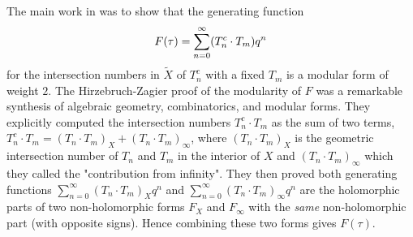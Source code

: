 The main work in \cite{HZ} was to show that the generating function
\[\vspace{-.1cm}
F(\tau) = \sum_{n=0}^{\infty} (T_n^c \cdot T_m) q^n \vspace{-.1cm}
\]
for the intersection numbers in $\tilde{X}$ of $T^c_n$ with a fixed $T_m$ is a modular form of weight $2$. The Hirzebruch-Zagier proof of the modularity of $F$ was a remarkable synthesis of algebraic geometry, combinatorics, and modular forms. They explicitly computed the intersection numbers $T_n^c \cdot T_m$ as the sum of two terms, $T_n^c \cdot T_m = (T_n \cdot T_m)_X  + ({T}_n \cdot {T}_m)_{\infty}$, where $(T_n \cdot T_m)_X $ is the geometric intersection number of $T_n$ and $T_m$ in the interior of $X$ and $({T}_n \cdot {T}_m)_{\infty}$ which they called the "contribution from infinity". They then proved both generating functions $\sum_{n=0}^{\infty} (T_n \cdot T_m)_X  q^n$ and $\sum_{n=0}^{\infty}  (T_n \cdot T_m)_{\infty} q^n$ are the holomorphic parts of two non-holomorphic forms $F_X$ and $F_{\infty}$ with the {\it same} non-holomorphic part (with opposite signs). Hence combining these two forms gives $F(\tau)$.

